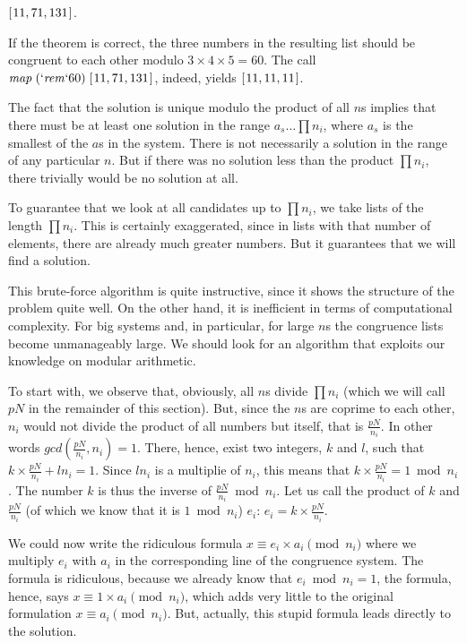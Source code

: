 \documentclass{scrreprt}
\newcommand{\Varid}[1]{\mathit{#1}}
\begin{document}
\ensuremath{[\mskip1.5mu \mathrm{11},\mathrm{71},\mathrm{131}\mskip1.5mu]}.

If the theorem is correct, the three numbers
in the resulting list should be congruent to each other modulo 
$3 \times 4 \times 5=60$.
The call \ensuremath{\Varid{map}\;(\mathbin{\Varid{`rem`}}\mathrm{60})\;[\mskip1.5mu \mathrm{11},\mathrm{71},\mathrm{131}\mskip1.5mu]}, indeed, yields \ensuremath{[\mskip1.5mu \mathrm{11},\mathrm{11},\mathrm{11}\mskip1.5mu]}.

The fact that the solution is unique 
modulo the product of all $n$s implies
that there must be at least one solution
in the range $a_s \dots \prod{n_i}$,
where $a_s$ is the smallest of the $a$s in the system.
There is not necessarily a solution in the range
of any particular $n$. But if there was no solution
less than the product $\prod{n_i}$,
there trivially would be no solution at all.

To guarantee that we look at all candidates
up to $\prod{n_i}$, we take lists 
of the length $\prod{n_i}$. This is certainly
exaggerated, since in lists with that number
of elements, there are already much greater numbers.
But it guarantees that we will find a solution.

This brute-force algorithm is quite instructive,
since it shows the structure of the problem
quite well. On the other hand, 
it is inefficient in terms of computational complexity.
For big systems and, in particular, for large $n$s
the congruence lists become unmanageably large.
We should look for an algorithm
that exploits our knowledge on modular arithmetic.

To start with, we observe that, obviously,
all $n$s divide $\prod{n_i}$
(which we will call $pN$ in the remainder of this section).
But, since the $n$s are coprime to each other, $n_i$ would
not divide the product of all numbers but itself,
that is $\frac{pN}{n_i}$. In other words 
$gcd(\frac{pN}{n_i}, n_i) = 1$.
There, hence, exist two integers, $k$ and $l$,
such that $k \times \frac{pN}{n_i} + ln_i = 1$.
Since $ln_i$ is a multiplie of $n_i$,
this means that 
$k \times \frac{pN}{n_i} = 1 \bmod n_i$.
The number $k$ is thus the inverse of $\frac{pN}{n_i} \bmod n_i$.
Let us call the product of $k$ and $\frac{pN}{n_i}$ 
(of which we know that it is $1 \bmod n_i$) $e_i$:
$e_i = k \times \frac{pN}{n_i}$.

We could now write the ridiculous formula
$x \equiv e_i \times a_i \pmod{n_i}$ 
where we multiply $e_i$ with $a_i$ in the 
corresponding line of the congruence system.
The formula is ridiculous, because we already know
that $e_i \bmod n_i = 1$, the formula, hence, says
$x \equiv 1 \times a_i \pmod{n_i}$,
which adds very little to the original formulation
$x \equiv a_i \pmod{n_i}$.
But, actually, this stupid formula leads directly
to the solution.
\end{document}
